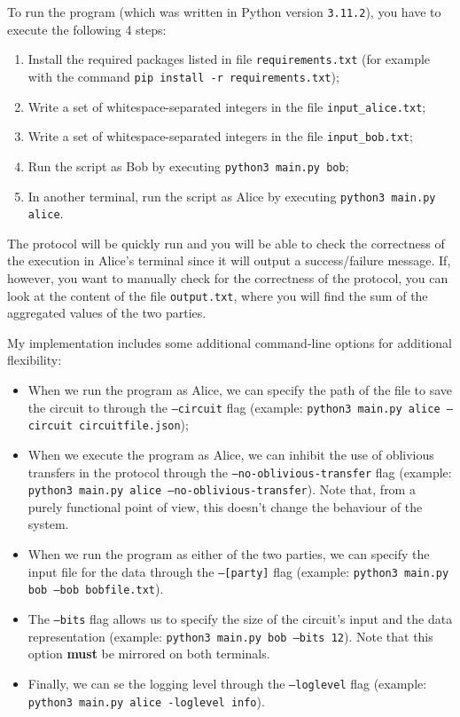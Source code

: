 \documentclass[12pt]{article}
\begin{document}
To run the program (which was written in Python version \texttt{3.11.2}), you have to execute the following 4 steps:

\begin{enumerate}
  \item Install the required packages listed in file \texttt{requirements.txt} (for example with the command \texttt{pip install -r requirements.txt});
  \item Write a set of whitespace-separated integers in the file \texttt{input\_alice.txt};
  \item Write a set of whitespace-separated integers in the file \texttt{input\_bob.txt};
  \item Run the script as Bob by executing \texttt{python3 main.py bob};
  \item In another terminal, run the script as Alice by executing \texttt{python3 main.py alice}.
\end{enumerate}

The protocol will be quickly run and you will be able to check the correctness of the execution in Alice's terminal since it will output a success/failure message. If, however, you want to manually check for the correctness of the protocol, you can look at the content of the file \texttt{output.txt}, where you will find the sum of the aggregated values of the two parties.

My implementation includes some additional command-line options for additional flexibility:

\begin{itemize}
  \item When we run the program as Alice, we can specify the path of the file to save the circuit to through the \texttt{--circuit} flag (example: \texttt{python3 main.py alice --circuit circuitfile.json});
  \item When we execute the program as Alice, we can inhibit the use of oblivious transfers in the protocol through the \texttt{--no-oblivious-transfer} flag (example: \texttt{python3 main.py alice --no-oblivious-transfer}). Note that, from a purely functional point of view, this doesn't change the behaviour of the system.
  \item When we run the program as either of the two parties, we can specify the input file for the data through the \texttt{--[party]} flag (example: \texttt{python3 main.py bob --bob bobfile.txt}).
  \item The \texttt{--bits} flag allows us to specify the size of the circuit's input and the data representation (example: \texttt{python3 main.py bob --bits 12}). Note that this option \textbf{must} be mirrored on both terminals.
  \item Finally, we can se the logging level through the \texttt{--loglevel} flag (example: \texttt{python3 main.py alice -loglevel info}).
\end{itemize}
\end{document}
